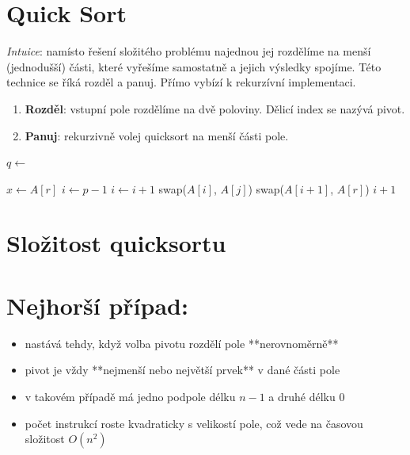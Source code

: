 \documentclass[openany,12pt,a4paper]{book}
\begin{document}
\section{Quick Sort}
\emph{Intuice}: namísto řešení složitého problému najednou jej rozdělíme na menší
(jednodušší) části, které vyřešíme samostatně a jejich výsledky spojíme. Této technice se říká 
rozděl a panuj. Přímo vybízí k rekurzívní implementaci. 
\begin{enumerate}
	\item \textbf{Rozděl}: vstupní pole rozdělíme na dvě poloviny. Dělicí index se nazývá pivot.
	\item \textbf{Panuj}: rekurzivně volej quicksort na menší části pole. 
\end{enumerate}

\begin{algorithm}[H]
\caption{Quick-Sort(A, p, r)}
\begin{algorithmic}[1]
        \State $q \gets$ 
        \State {}
        \State {}
    \EndIf
\EndProcedure

    \State $x \gets A[r]$ 
    \State $i \gets p - 1$
            \State $i \gets i + 1$
            \State swap($A[i]$, $A[j]$)
        \EndIf
    \EndFor
    \State swap($A[i+1]$, $A[r]$)
    \State \Return $i + 1$
\EndProcedure
\end{algorithmic}
\end{algorithm}


\section{Složitost quicksortu}
\section*{Nejhorší případ:}
\begin{itemize}
    \item nastává tehdy, když volba pivotu rozdělí pole **nerovnoměrně**
    \item pivot je vždy **nejmenší nebo největší prvek** v dané části pole
    \item v takovém případě má jedno podpole délku $n-1$ a druhé délku $0$
    \item počet instrukcí roste kvadraticky s velikostí pole, což vede na časovou složitost $O(n^2)$
\end{itemize}
\end{document}
